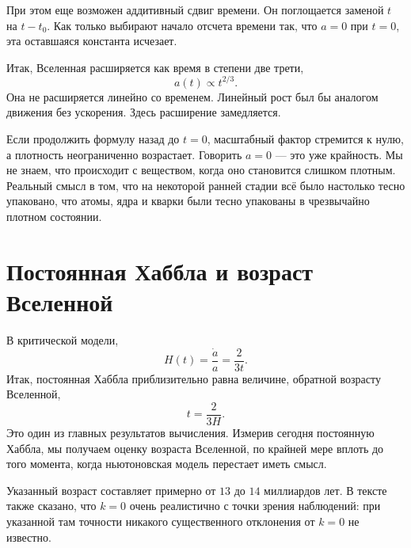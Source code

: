 При этом еще возможен аддитивный сдвиг времени. Он поглощается заменой \(t\) на \(t-t_0\). Как только выбирают начало отсчета времени так, что \(a=0\) при \(t=0\), эта оставшаяся константа исчезает.

Итак, Вселенная расширяется как время в степени две трети,
\begin{equation}
a(t)\propto t^{2/3}.
\end{equation}
Она не расширяется линейно со временем. Линейный рост был бы аналогом движения без ускорения. Здесь расширение замедляется.

Если продолжить формулу назад до \(t=0\), масштабный фактор стремится к нулю, а плотность неограниченно возрастает. Говорить \(a=0\) — это уже крайность. Мы не знаем, что происходит с веществом, когда оно становится слишком плотным. Реальный смысл в том, что на некоторой ранней стадии всё было настолько тесно упаковано, что атомы, ядра и кварки были тесно упакованы в чрезвычайно плотном состоянии.

\section{Постоянная Хаббла и возраст Вселенной}

В критической модели,
\begin{equation}
H(t)=\frac{\dot a}{a}=\frac{2}{3t}.
\end{equation}
Итак, постоянная Хаббла приблизительно равна величине, обратной возрасту Вселенной,
\begin{equation}
t=\frac{2}{3H}.
\end{equation}
Это один из главных результатов вычисления. Измерив сегодня постоянную Хаббла, мы получаем оценку возраста Вселенной, по крайней мере вплоть до того момента, когда ньютоновская модель перестает иметь смысл.

Указанный возраст составляет примерно от \(13\) до \(14\) миллиардов лет. В тексте также сказано, что \(k=0\) очень реалистично с точки зрения наблюдений: при указанной там точности никакого существенного отклонения от \(k=0\) не известно.

\begin{classroomqa}
\end{classroomqa}

